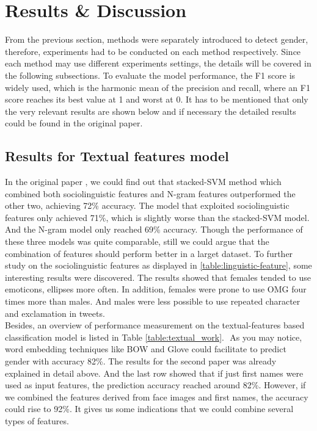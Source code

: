 \documentclass[runningheads]{llncs}
\begin{document}
	
	\section{Results \& Discussion}
	From the previous section, methods were separately introduced to detect gender, therefore, experiments had to be conducted on each method respectively. Since each method may use different experiments settings, the details will be covered in the following subsections. To evaluate the model performance, the F1 score is widely used, which is the harmonic mean of the precision and recall, where an F1 score reaches its best value at 1 and worst at 0. It has to be mentioned that only the very relevant results are shown below and if necessary the detailed results could be found in the original paper. 
	
	\subsection{Results for Textual features model}
	
	In the original paper \cite{rao2010classifying}, we could find out that stacked-SVM method which combined both sociolinguistic features and N-gram features outperformed the other two, achieving 72\% accuracy. The model that exploited sociolinguistic features only achieved 71\%, which is slightly worse than the stacked-SVM model. And the N-gram model only reached 69\% accuracy. Though the performance of these three models was quite comparable, still we could argue that the combination of features should perform better in a larget dataset. To further study on the sociolinguistic features as displayed in \ref{table:linguistic-feature}, some interesting results were discovered. The results showed that females tended to use emoticons, ellipses more often. In addition, females were prone to use OMG four times more than males. And males were less possible to use repeated character and exclamation in tweets. \\
	
	Besides, an overview of performance measurement on the textual-features based classification model is listed in Table \ref{table:textual_work}.  As you may notice, word embedding techniques like BOW and Glove could facilitate to predict gender with accuracy 82\%. The results for the second paper was already explained in detail above. And the last row showed that if just first names were used as input features, the prediction accuracy reached around 82\%. However, if we combined the features derived from face images and first names, the accuracy could rise to 92\%. It gives us some indications that we could combine several types of features. 
	
\end{document}
